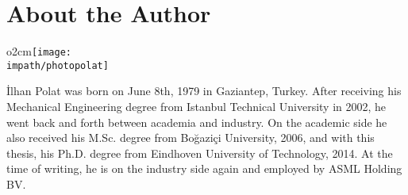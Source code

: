 \chapter{About the Author}


\begin{wrapfigure}[7]{o}{2cm}\centering\vspace{-4mm}\texttt{[image: \\impath/photopolat]}\end{wrapfigure}
İlhan Polat was born on June 8th, 1979 in Gaziantep, Turkey. After receiving his Mechanical Engineering degree from Istanbul 
Technical University in 2002, he went back and forth between academia and industry. On the academic side he also received his M.Sc. 
degree from Bo\u{g}azi\c{c}i University, 2006, and with this thesis, his Ph.D. degree from Eindhoven University of Technology, 2014. 
At the time of writing, he is on the industry side again and employed by ASML Holding BV. 

